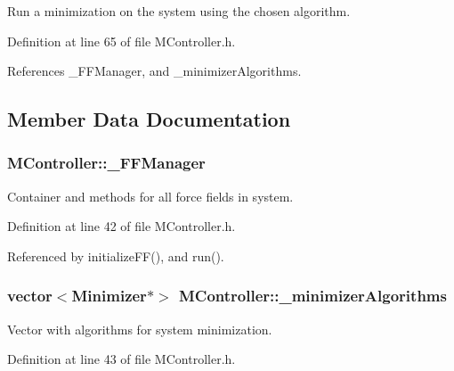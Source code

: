 Run a minimization on the system using the chosen algorithm. 



Definition at line 65 of file M\+Controller.\+h.



References \+\_\+\+F\+F\+Manager, and \+\_\+minimizer\+Algorithms.



\subsection{Member Data Documentation}
\hypertarget{classMController_ac3c4b1b840a877dcb713c7063d5c94b7}{
\subsubsection[{\+\_\+\+F\+F\+Manager}]{ M\+Controller\+::\+\_\+\+F\+F\+Manager\hspace{0.3cm}{\ttfamily [private]}}}\label{classMController_ac3c4b1b840a877dcb713c7063d5c94b7}


Container and methods for all force fields in system. 



Definition at line 42 of file M\+Controller.\+h.



Referenced by initialize\+F\+F(), and run().

\hypertarget{classMController_a332c6625d156824a3bdd5cb44b57c142}{
\subsubsection[{\+\_\+minimizer\+Algorithms}]{\setlength{\rightskip}{0pt plus 5cm}vector$<${\bf Minimizer}$\ast$$>$ M\+Controller\+::\+\_\+minimizer\+Algorithms\hspace{0.3cm}{\ttfamily [private]}}}\label{classMController_a332c6625d156824a3bdd5cb44b57c142}


Vector with algorithms for system minimization. 



Definition at line 43 of file M\+Controller.\+h.



